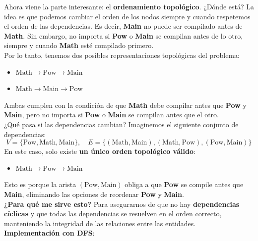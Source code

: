 \documentclass[10pt,a4paper]{article}
\begin{document}
Ahora viene la parte interesante: el \textbf{ordenamiento topológico}. ¿Dónde está? La idea es que podemos cambiar el orden de los nodos siempre y cuando respetemos el orden de las dependencias. Es decir, \textbf{Main} no puede ser compilado antes de \textbf{Math}. Sin embargo, no importa si \textbf{Pow} o \textbf{Main} se compilan antes de lo otro, siempre y cuando \textbf{Math} esté compilado primero. \\
Por lo tanto, tenemos dos posibles representaciones topológicas del problema:
\begin{itemize}
    \item $ \text{Math} \rightarrow \text{Pow} \rightarrow \text{Main} $
    \item $ \text{Math} \rightarrow \text{Main} \rightarrow \text{Pow} $
\end{itemize}
Ambas cumplen con la condición de que \textbf{Math} debe compilar antes que \textbf{Pow} y \textbf{Main}, pero no importa si \textbf{Pow} o \textbf{Main} se compilan antes que el otro. \\
¿Qué pasa si las dependencias cambian? Imaginemos el siguiente conjunto de dependencias:
\[
V = \{ \text{Pow}, \text{Math}, \text{Main} \}, \quad E = \{ (\text{Math}, \text{Main}), (\text{Math}, \text{Pow}), (\text{Pow}, \text{Main}) \}
\]
En este caso, solo existe \textbf{un único orden topológico válido}:
\begin{itemize}
    \item $ \text{Math} \rightarrow \text{Pow} \rightarrow \text{Main} $
\end{itemize}
Esto es porque la arista $(\text{Pow}, \text{Main})$ obliga a que \textbf{Pow} se compile antes que \textbf{Main}, eliminando las opciones de reordenar \textbf{Pow} y \textbf{Main}. \\
\textbf{¿Para qué me sirve esto?} Para asegurarnos de que no hay \textbf{dependencias cíclicas} y que todas las dependencias se resuelven en el orden correcto, manteniendo la integridad de las relaciones entre las entidades. \\
\textbf{Implementación con DFS}: 
\end{document}
